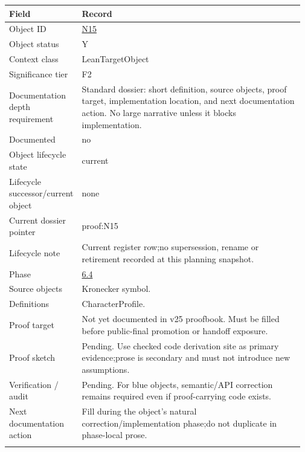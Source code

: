 \begin{longtable}{L{0.16\linewidth} L{0.81\linewidth}}
\hline
\textbf{Field} & \textbf{Record}\\
\hline
Object ID & \hyperlink{object-row-N15}{N15}\\
\hline\addlinespace[0.20em]
Object status & Y\\
\hline\addlinespace[0.20em]
Context class & LeanTargetObject\\
\hline\addlinespace[0.20em]
Significance tier & F2\\
\hline\addlinespace[0.20em]
Documentation depth requirement & Standard dossier: short definition, source objects, proof target, implementation location, and next documentation action. No large narrative unless it blocks implementation.\\
\hline\addlinespace[0.20em]
Documented & no\\
\hline\addlinespace[0.20em]
Object lifecycle state & current\\
\hline\addlinespace[0.20em]
Lifecycle successor/\allowbreak{}current object & none\\
\hline\addlinespace[0.20em]
Current dossier pointer & proof:N15\\
\hline\addlinespace[0.20em]
Lifecycle note & Current register row;\newline no supersession, rename or retirement recorded at this planning snapshot.\\
\hline\addlinespace[0.20em]
Phase & \hyperlink{phase-row-6-4}{6.4}\\
\hline\addlinespace[0.20em]
Source objects & Kronecker symbol.\\
\hline\addlinespace[0.20em]
Definitions & CharacterProfile.\\
\hline\addlinespace[0.20em]
Proof target & Not yet documented in v25 proofbook. Must be filled before public-final promotion or handoff exposure.\\
\hline\addlinespace[0.20em]
Proof sketch & Pending. Use checked code derivation site as primary evidence;\newline prose is secondary and must not introduce new assumptions.\\
\hline\addlinespace[0.20em]
Verification /\allowbreak{} audit & Pending. For blue objects, semantic/\allowbreak{}API correction remains required even if proof-carrying code exists.\\
\hline\addlinespace[0.20em]
Next documentation action & Fill during the object's natural correction/\allowbreak{}implementation phase;\newline do not duplicate in phase-local prose.\\
\hline\addlinespace[0.20em]
\end{longtable}
